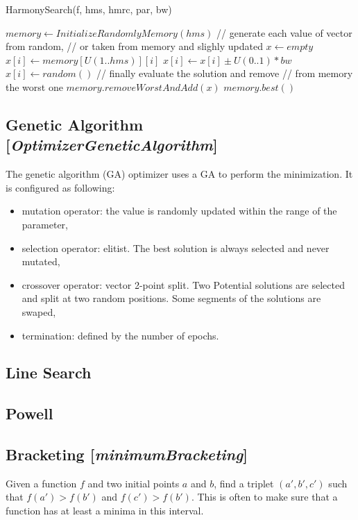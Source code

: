 \documentclass[11pt]{article}
\newcommand{\nllref}[1]{[\small{\textit{#1}}]}
\begin{document}
\begin{algorithm}
\caption{HarmonySearch(f, hms, hmrc, par, bw)}
\begin{algorithmic} 
\STATE $memory \leftarrow InitializeRandomlyMemory(hms)$
\STATE // generate each value of vector from random,
\STATE // or taken from memory and slighly updated
\STATE $x \leftarrow empty$
\STATE $x[i] \leftarrow memory[U(1..hms)][i]$
\STATE $x[i] \leftarrow x[i] \pm U(0..1) * bw$
\ENDIF
\ELSE
\STATE $x[i] \leftarrow random()$
\ENDIF
\ENDFOR
\STATE // finally evaluate the solution and remove
\STATE // from memory the worst one
\STATE $memory.removeWorstAndAdd(x)$
\ENDIF
\ENDWHILE
\RETURN $memory.best()$

\end{algorithmic}
\end{algorithm}

\FloatBarrier

\subsection{Genetic Algorithm \nllref{OptimizerGeneticAlgorithm}}
The genetic algorithm (GA) optimizer uses a GA to perform the minimization. It is configured as following:
\begin{itemize}
\item mutation operator: the value is randomly updated within the range of the parameter,
\item selection operator: elitist. The best solution is always selected and never mutated,
\item crossover operator: vector 2-point split. Two Potential solutions are selected and split at two random positions. Some segments of the solutions are swaped,
\item termination: defined by the number of epochs.
\end{itemize}

\subsection{Line Search}
\subsection{Powell}

\subsection{Bracketing \nllref{minimumBracketing}}
Given a function $f$ and two initial points $a$ and $b$, find a triplet $(a', b', c')$ such that $f(a')>f(b')$ and  $f(c')>f(b')$. This is often to make sure that a function has at least a minima in this interval.
\end{document}
